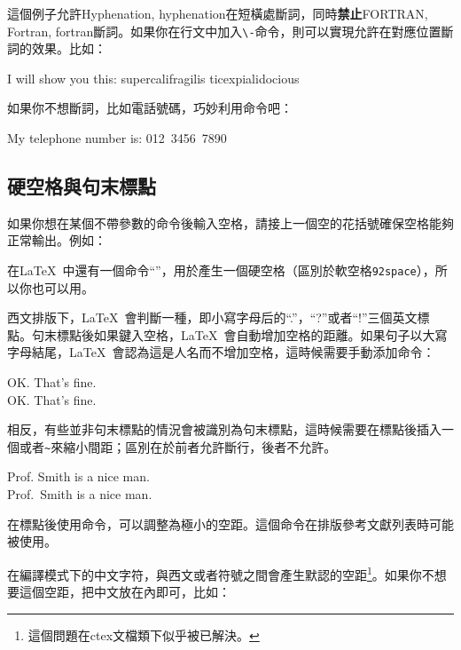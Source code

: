 這個例子允許Hyphenation, hyphenation在短橫處斷詞，同時\textbf{禁止}FORTRAN, Fortran, fortran斷詞。如果你在行文中加入\verb|\-|命令，則可以實現允許在對應位置斷詞的效果。比如：

\begin{codeshow}
I will show you this:
su\-per\-cal\-i\-frag\-i\-lis\-%
tic\-ex\-pi\-al\-i\-do\-cious
\end{codeshow}

如果你不想斷詞，比如電話號碼，巧妙利用命令吧：
\begin{latex}
My telephone number is: \mbox{012 3456 7890}
\end{latex}

\subsection{硬空格與句末標點}
如果你想在某個不帶參數的命令後輸入空格，請接上一個空的花括號確保空格能夠正常輸出。例如：

在\LaTeX\ 中還有一個命令“\texttt{\textvisiblespace}”，用於產生一個硬空格（區別於軟空格\texttt{\char92space}），所以你也可以用。

西文排版下，\LaTeX\ 會判斷一種，即小寫字母后的“.”，“?”或者“!”三個英文標點。句末標點後如果鍵入空格，\LaTeX\ 會自動增加空格的距離。如果句子以大寫字母結尾，\LaTeX\ 會認為這是人名而不增加空格，這時候需要手動添加命令：

\begin{codeshow}
OK. That's fine.\\
OK\@. That's fine.
\end{codeshow}

相反，有些並非句末標點的情況會被識別為句末標點，這時候需要在標點後插入一個\latexline{\textvisiblespace}或者\verb|~|來縮小間距；區別在於前者允許斷行，後者不允許。

\begin{codeshow}
Prof. Smith is a nice man.\\
Prof.~Smith is a nice man.
\end{codeshow}

在標點後使用命令，可以調整為極小的空距。這個命令在排版參考文獻列表時可能被使用。

在\xelatex 編譯模式下的中文字符，與西文或者符號之間會產生默認的空距\footnote{這個問題在ctex文檔類下似乎被已解決。}。如果你不想要這個空距，把中文放在內即可，比如：

